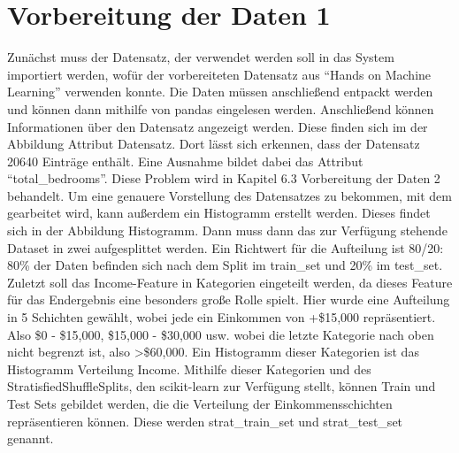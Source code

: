 \section{Vorbereitung der Daten 1}
\label{VorbereitungDerDaten1}
Zunächst muss der Datensatz, der verwendet werden soll in das System importiert werden, wofür der vorbereiteten Datensatz aus “Hands on Machine Learning” verwenden konnte\cite{DATA}. Die Daten müssen anschließend entpackt werden und können dann mithilfe von pandas eingelesen werden. 
Anschließend können Informationen über den Datensatz angezeigt werden. Diese finden sich im der Abbildung Attribut Datensatz. Dort lässt sich erkennen, dass der Datensatz 20640 Einträge enthält. Eine Ausnahme bildet dabei das Attribut “total\_bedrooms”. Diese Problem wird in Kapitel 6.3 Vorbereitung der Daten 2 behandelt.
Um eine genauere Vorstellung des Datensatzes zu bekommen, mit dem gearbeitet wird, kann außerdem ein Histogramm erstellt werden. Dieses findet sich in der Abbildung Histogramm. 
Dann muss dann das zur Verfügung stehende Dataset in zwei aufgesplittet werden. Ein Richtwert für die Aufteilung ist 80/20: 80\% der Daten befinden sich nach dem Split im train\_set und 20\% im test\_set.
Zuletzt soll das Income-Feature in Kategorien eingeteilt werden, da dieses Feature für das Endergebnis eine besonders große Rolle spielt. Hier wurde eine Aufteilung in 5 Schichten gewählt, wobei jede ein Einkommen von +\$15,000 repräsentiert. 
Also \$0 - \$15,000, \$15,000 - \$30,000 usw. wobei die letzte Kategorie nach oben nicht begrenzt ist, also >\$60,000. Ein Histogramm dieser Kategorien ist das Histogramm Verteilung Income. Mithilfe dieser Kategorien und des StratisfiedShuffleSplits, den scikit-learn zur Verfügung stellt, können Train und Test Sets gebildet werden, die die Verteilung der Einkommensschichten repräsentieren können. Diese werden strat\_train\_set und strat\_test\_set genannt.

